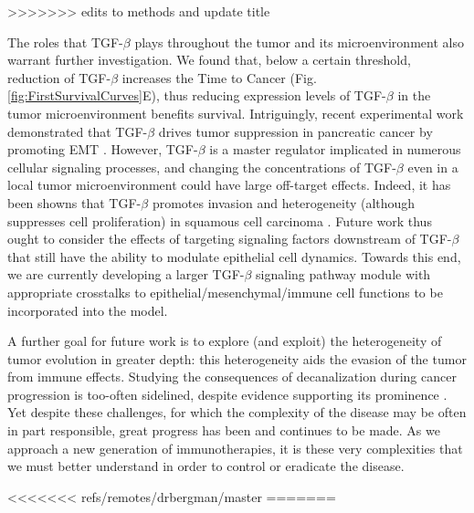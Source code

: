 \documentclass[11pt]{article}
\begin{document}
>>>>>>> edits to methods and update title
\par
The roles that TGF-$\beta$ plays throughout the tumor and its microenvironment also warrant further investigation. We found that, below a certain threshold, reduction of TGF-$\beta$ increases the Time to Cancer  (Fig. \ref{fig:FirstSurvivalCurves}E), thus reducing expression levels of TGF-$\beta$ in the tumor microenvironment benefits survival. Intriguingly, recent experimental work demonstrated that TGF-$\beta$ drives tumor suppression in pancreatic cancer by promoting EMT \cite{david16_tgfv}. However, TGF-$\beta$ is a master regulator implicated in numerous cellular signaling processes, and changing the concentrations of TGF-$\beta$ even in a local tumor microenvironment could have large off-target effects. Indeed, it has been showns that TGF-$\beta$ promotes invasion and heterogeneity (although suppresses cell proliferation) in squamous cell carcinoma \cite{oshimori15_tgfv}. Future work thus ought to consider the effects of targeting signaling factors downstream of TGF-$\beta$ that still have the ability to modulate epithelial cell dynamics. Towards this end, we are currently developing a larger TGF-$\beta$ signaling pathway module with appropriate crosstalks to  epithelial/mesenchymal/immune cell functions to be incorporated into the model.
\par
A further goal for future work is to explore (and exploit) the heterogeneity of tumor evolution in greater depth: this heterogeneity aids the evasion of the tumor from immune effects. Studying the consequences of decanalization \cite{gibson09_decanalization} during cancer progression is too-often sidelined, despite evidence supporting its prominence \cite{cyll17_tumour, punt17_tumour, dagogo-jack18_tumour}. Yet despite these challenges, for which the complexity of the disease may be often in part responsible, great progress has been and continues to be made. As we approach a new generation of immunotherapies, it is these very complexities that we must better understand in order to control or eradicate the disease.

<<<<<<< refs/remotes/drbergman/master
=======
\end{document}
